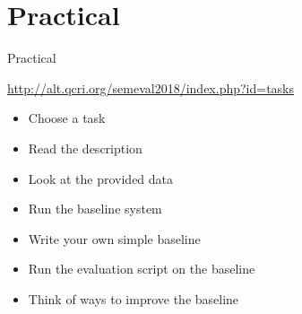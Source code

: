 \documentclass[10pt, compress]{beamer}
\begin{document}



\section{Practical}

\begin{frame}{Practical}

\begin{center}
\url{http://alt.qcri.org/semeval2018/index.php?id=tasks}
\end{center}

\begin{itemize}
  \item Choose a task
  \item Read the description
  \item Look at the provided data
  \item Run the baseline system
  \item Write your own simple baseline
  \item Run the evaluation script on the baseline
  \item Think of ways to improve the baseline
\end{itemize}

\end{frame}
\end{document}

